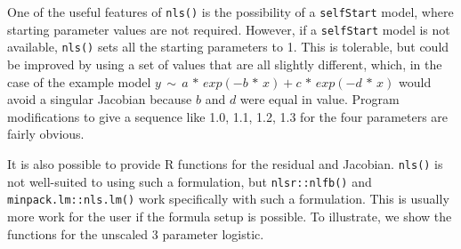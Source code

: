 \documentclass[
]{article}
\begin{document}
One of the useful features of \texttt{nls()} is the possibility of a
\texttt{selfStart} model, where starting parameter values are not
required. However, if a \texttt{selfStart} model is not available,
\texttt{nls()} sets all the starting parameters to 1. This is tolerable,
but could be improved by using a set of values that are all slightly
different, which, in the case of the example model
\(y \,\sim\, a \,*\, exp(-b \,*\, x) + c\,*\,exp(-d \,*\, x)\) would
avoid a singular Jacobian because \(b\) and \(d\) were equal in value.
Program modifications to give a sequence like 1.0, 1.1, 1.2, 1.3 for the
four parameters are fairly obvious.

It is also possible to provide R functions for the residual and
Jacobian. \texttt{nls()} is not well-suited to using such a formulation,
but \texttt{nlsr::nlfb()} and \texttt{minpack.lm::nls.lm()} work
specifically with such a formulation. This is usually more work for the
user if the formula setup is possible. To illustrate, we show the
functions for the unscaled 3 parameter logistic.
\end{document}
